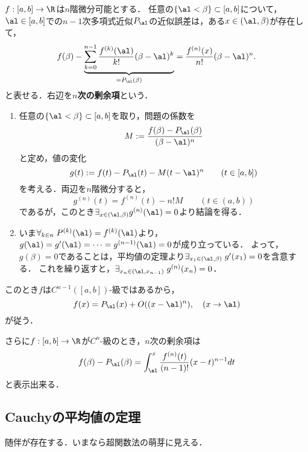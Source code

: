 \documentclass[uplatex, dvipdfmx]{jsreport}
\begin{document}
\begin{theorem}
    $f:[a,b]\to\R$は$n$階微分可能とする．
    任意の$\{\al<\beta\}\subset[a,b]$について，$\al\in[a,b]$での$n-1$次多項式近似$P_\al$の近似誤差は，ある$x\in(\al,\beta)$が存在して，
    \[f(\beta)-\underbrace{\sum_{k=0}^{n-1}\frac{f^{(k)}(\al)}{k!}(\beta-\al)^k}_{=P_\al(\beta)}=\frac{f^{(n)}(x)}{n!}(\beta-\al)^n.\]
    と表せる．右辺を\textbf{$n$次の剰余項}という．
\end{theorem}
\begin{Proof}\mbox{}
    \begin{enumerate}[{Step}1]
        \item 任意の$\{\al<\beta\}\subset[a,b]$を取り，問題の係数を
        \[M:=\frac{f(\beta)-P_\al(\beta)}{(\beta-\al)^n}\]
        と定め，値の変化
        \[g(t):=f(t)-P_\al(t)-M(t-\al)^n\qquad(t\in[a,b])\]
        を考える．両辺を$n$階微分すると，
        \[g^{(n)}(t)=f^{(n)}(t)-n!M\qquad(t\in(a,b))\]
        であるが，このとき$\exists_{x\in(\al,\beta)}g^{(n)}(\al)=0$より結論を得る．
        \item いま$\forall_{k\in n}\;P^{(k)}(\al)=f^{(k)}(\al)$より，$g(\al)=g'(\al)=\cdots=g^{(n-1)}(\al)=0$が成り立っている．
        よって，$g(\beta)=0$であることは，平均値の定理より$\exists_{x_1\in(\al,\beta)}\;g'(x_1)=0$を含意する．
        これを繰り返すと，$\exists_{x_n\in(\al,x_{n-1})}\;g^{(n)}(x_n)=0$．
    \end{enumerate}
\end{Proof}
\begin{remarks}
    このとき$f$は$C^{n-1}([a,b])$-級ではあるから，
    \[f(x)=P_\al(x)+O((x-\al)^n),\quad(x\to\al)\]
    が従う．
\end{remarks}

\begin{proposition}
    さらに$f:[a,b]\to\R$が$C^n$-級のとき，$n$次の剰余項は
    \[f(\beta)-P_\al(\beta)=\int^x_\al\frac{f^{(n)}(t)}{(n-1)!}(x-t)^{n-1}dt\]
    と表示出来る．
\end{proposition}

\subsection{Cauchyの平均値の定理}

\begin{tcolorbox}[colframe=ForestGreen, colback=ForestGreen!10!white,breakable,colbacktitle=ForestGreen!40!white,coltitle=black,fonttitle=\bfseries\sffamily,
title=]
    随伴が存在する．いまなら超関数法の萌芽に見える．
\end{tcolorbox}
\end{document}
